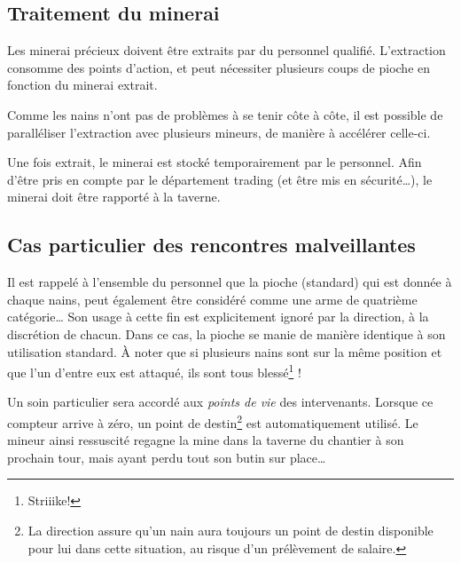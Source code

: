 \subsection{Traitement du minerai}

  Les minerai précieux doivent être extraits par du personnel qualifié.
  L'extraction consomme des points d'action, et peut nécessiter plusieurs coups
  de pioche en fonction du minerai extrait.

  Comme les nains n'ont pas de problèmes à se tenir côte à côte, il est
  possible de paralléliser l'extraction avec plusieurs mineurs, de manière à
  accélérer celle-ci.

  Une fois extrait, le minerai est stocké temporairement par le personnel. Afin
  d'être pris en compte par le département trading (et être mis en
  sécurité\ldots{}), le minerai doit être rapporté à la taverne.

\subsection{Cas particulier des rencontres malveillantes}

  Il est rappelé à l'ensemble du personnel que la pioche (standard) qui est
  donnée à chaque nains, peut également être considéré comme une arme de
  quatrième catégorie\ldots{} Son usage à cette fin est explicitement ignoré par la
  direction, à la discrétion de chacun. Dans ce cas, la pioche se manie de
  manière identique à son utilisation standard. À noter que si plusieurs nains
  sont sur la même position et que l'un d'entre eux est attaqué, ils sont tous
  blessé\footnote{Striiike!} !

  Un soin particulier sera accordé aux \textit{points de vie} des intervenants.
  Lorsque ce compteur arrive à zéro, un point de destin\footnote{La direction
  assure qu'un nain aura toujours un point de destin disponible pour lui dans
  cette situation, au risque d'un prélèvement de salaire.} est automatiquement
  utilisé. Le mineur ainsi ressuscité regagne la mine dans la taverne du
  chantier à son prochain tour, mais ayant perdu tout son butin sur
  place\ldots{}

